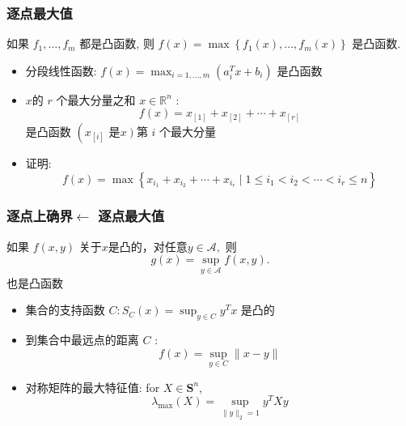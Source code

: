 \documentclass[handout,10pt]{beamer}
\begin{document}
\begin{frame}
	\frametitle{逐点最大值}
\begin{mytheorem}
  如果 $f_{1}, \ldots, f_{m}$ 都是凸函数, 则 $f(x)=\max \left\{f_{1}(x), \ldots, f_{m}(x)\right\}$ 是凸函数.	
\end{mytheorem}
	



	\begin{itemize}%
		\item<2-> 分段线性函数: $f(x)=\max _{i=1, \ldots, m}\left(a_{i}^{T} x+b_{i}\right)$ 是凸函数
		\item<3-> $x$的 $r$ 个最大分量之和 $x \in \mathbb{R}^{n}$ :
		\begin{equation}
			f(x)=x_{[1]}+x_{[2]}+\cdots+x_{[r]}
		\end{equation}
		是凸函数 $\left(x_{[i]}\right.$ 是$\left.x\right)$第 $i$ 个最大分量 

		 \item<4-> 证明:
       \begin{equation}
	   f(x)=\max \left\{x_{i_{1}}+x_{i_{2}}+\cdots+x_{i_{r}} \mid 1 \leq i_{1}<i_{2}<\cdots<i_{r} \leq n\right\}
       \end{equation}
	\end{itemize}


\end{frame}
\begin{frame}
	\frametitle{逐点上确界{$\leftarrow$ 逐点最大值}}
\begin{mytheorem}
	如果 $f(x, y)$ 关于$x$是凸的，对任意$y \in \mathcal{A},$ 则
	\begin{equation}
		g(x)=\sup _{y \in \mathcal{A}} f(x, y).
	\end{equation}
    也是凸函数
\end{mytheorem}

 
    \begin{itemize}
    	\item<2-> 集合的支持函数 $C: S_{C}(x)=\sup _{y \in C} y^{T} x$ 是凸的
    	\item<3-> 到集合中最远点的距离 $C$  :
    	\begin{equation}
    		f(x)=\sup _{y \in C}\|x-y\|
    	\end{equation}
    	\item<4-> 对称矩阵的最大特征值: for $X \in \mathbf{S}^{n}$,
    	\begin{equation}
    		\lambda_{\max }(X)=\sup _{\|y\|_{2}=1} y^{T} X y
    	\end{equation}
    \end{itemize}
\end{frame}
\end{document}
